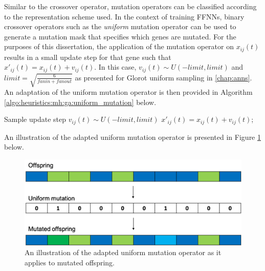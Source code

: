 Similar to the crossover operator, mutation operators can be classified according to the representation scheme used. In the context of training
\acp{FFNN}, binary crossover operators such as the \textit{uniform} mutation operator can be used to generate a mutation mask that specifies which genes are mutated. For the purposes of this dissertation, the application of the mutation operator on $x_{ij}(t)$ results in a small update step for that gene such that $x'_{ij}(t) = x_{ij}(t) + v_{ij}(t)$. In this case, $v_{ij}(t) \sim U(-limit, limit)$ and $limit = \sqrt{\frac{6}{fanin + fanout}}$ as presented for Glorot uniform sampling in \ref{chap:anns}. An adaptation of the uniform mutation operator is then provided in Algorithm \ref{algo:heuristics:mh:ga:uniform_mutation} below.

\begin{algorithm}[H]
      \caption{The pseudo code for the uniform mutation operator as used by \acp{GA}.}
      \label{algo:heuristics:mh:ga:uniform_mutation}
      \begin{algorithmic}
            \State Sample update step $v_{ij}(t) \sim U(-limit, limit)$
            \State $x'_{ij}(t) = x_{ij}(t) + v_{ij}(t)$;
            \EndIf
            \EndFor
            \State
      \end{algorithmic}
\end{algorithm}

An illustration of the adapted uniform mutation operator is presented in Figure \ref{fig:heuristics:mh:ga:uniform_mutation} below.

\begin{figure}[htbp]
      \includegraphics[width=\textwidth]{images/uniform_mutation.png}
      \caption{An illustration of the adapted uniform mutation operator as it applies to mutated offspring.}
      \label{fig:heuristics:mh:ga:uniform_mutation}
\end{figure}

